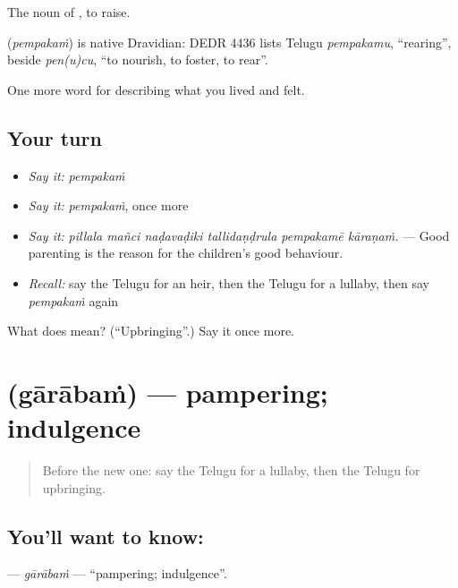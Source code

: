 The noun of , to raise.

\begin{cousinweb}
\textbf{} (\emph{pempakaṁ}) is native Dravidian: DEDR 4436 lists Telugu \emph{pempakamu}, \textquotedblleft{}rearing\textquotedblright{}, beside \emph{pen(u)cu}, \textquotedblleft{}to nourish, to foster, to rear\textquotedblright{}.
\end{cousinweb}

\begin{grammarlens}[title={What you've built}]
One more word for describing what you lived and felt.
\end{grammarlens}

\subsection*{Your turn}
\begin{itemize}
\raggedright
  \item \emph{Say it:} \emph{pempakaṁ}
  \item \emph{Say it:} \emph{pempakaṁ}, once more
  \item \emph{Say it:} \emph{pillala mañci naḍavaḍiki tallidaṇḍrula pempakamē kāraṇaṁ.} — Good parenting is the reason for the children's good behaviour.
  \item \emph{Recall:} say the Telugu for an heir, then the Telugu for a lullaby, then say \emph{pempakaṁ} again
\end{itemize}

\begin{tcolorbox}[breakable,colback=teal!4,colframe=teal!35!black,title={Before you move on}]
What does  mean? (\textquotedblleft{}Upbringing\textquotedblright{}.) Say it once more.
\end{tcolorbox}
\section[\texorpdfstring{\te{గారాబం} (gārābaṁ)}{గారాబం (gārābaṁ)}]{ (gārābaṁ) — pampering; indulgence}

\label{lesson:TE-C532-garabam}



\begin{quote}
Before the new one: say the Telugu for a lullaby, then the Telugu for upbringing.
\end{quote}

\subsection*{You'll want to know: }
\textbf{} — \emph{gārābaṁ} — \textquotedblleft{}pampering; indulgence\textquotedblright{}.

